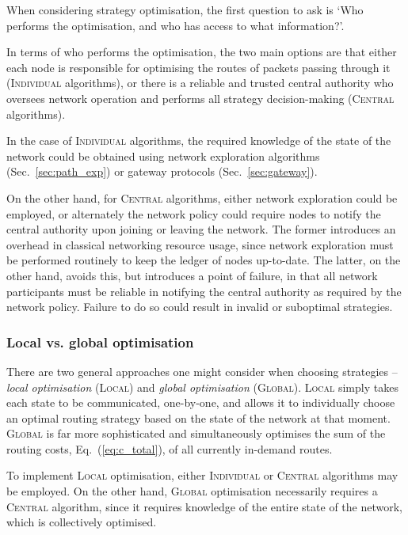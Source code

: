 \documentclass[aps, rmp, twocolumn, amsmath, amssymb, nofootinbib, superscriptaddress, longbibliography, floatfix, table-of-contents, eqsecnum]{revtex4-1}
\begin{document}
When considering strategy optimisation, the first question to ask is `Who performs the optimisation, and who has access to what information?'.

In terms of who performs the optimisation, the two main options are that either each node is responsible for optimising the routes of packets passing through it (\textsc{Individual} algorithms), or there is a reliable and trusted central authority who oversees network operation and performs all strategy decision-making (\textsc{Central} algorithms).

In the case of \textsc{Individual} algorithms, the required knowledge of the state of the network could be obtained using network exploration algorithms (Sec.~\ref{sec:path_exp}) or gateway protocols (Sec.~\ref{sec:gateway}). 

On the other hand, for \textsc{Central} algorithms, either network exploration could be employed, or alternately the network policy could require nodes to notify the central authority upon joining or leaving the network. The former introduces an overhead in classical networking resource usage, since network exploration must be performed routinely to keep the ledger of nodes up-to-date. The latter, on the other hand, avoids this, but introduces a point of failure, in that all network participants must be reliable in notifying the central authority as required by the network policy. Failure to do so could result in invalid or suboptimal strategies.

%
%

\subsubsection{Local vs. global optimisation} 

There are two general approaches one might consider when choosing strategies -- \textit{local optimisation} (\textsc{Local}) and \textit{global optimisation} (\textsc{Global}). \textsc{Local} simply takes each state to be communicated, one-by-one, and allows it to individually choose an optimal routing strategy based on the state of the network at that moment. \textsc{Global} is far more sophisticated and simultaneously optimises the sum of the routing costs, Eq.~(\ref{eq:c_total}), of all currently in-demand routes.

To implement \textsc{Local} optimisation, either \textsc{Individual} or \textsc{Central} algorithms may be employed. On the other hand, \textsc{Global} optimisation necessarily requires a \textsc{Central} algorithm, since it requires knowledge of the entire state of the network, which is collectively optimised.
\end{document}
